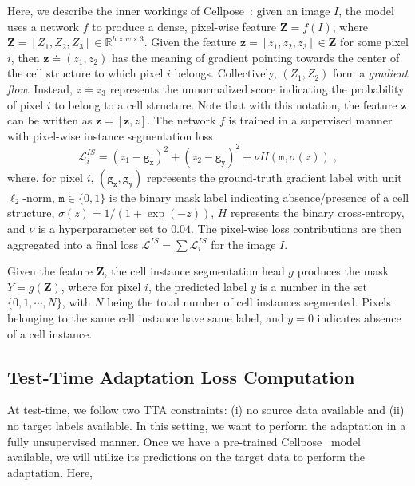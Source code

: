 Here, we describe the inner workings of Cellpose~\cite{stringer2021cellpose}: given an image $I$, the model uses a network $f$ to produce a dense, pixel-wise feature $\bm{Z} = f(I)$, where $ \bm{Z} = [Z_1, Z_2, Z_3] \in \mathbb{R}^{h \times w \times 3}$. Given the feature $\mathbf{z} = [z_1, z_2, z_3] \in \bm{Z}$ for some pixel $i$, then $\bm{z} \doteq (z_1, z_2)$ has the meaning of gradient pointing towards the center of the cell structure to which pixel $i$ belongs. Collectively, $(Z_1,Z_2)$ form a \emph{gradient flow}. Instead, $z \doteq z_3$ represents the unnormalized score indicating the probability of pixel $i$ to belong to a cell structure. Note that with this notation, the feature $\mathbf{z}$ can be written as $\mathbf{z} = [\bm{z}, z]$. The network $f$ is trained in a supervised manner with pixel-wise instance segmentation loss
\begin{equation}
  \mathcal{L}_i^{IS} = (z_1 - \mathtt{g_x})^2 + (z_2 - \mathtt{g_y})^2 + \nu H(\mathtt{m},\sigma(z))  \; ,
\end{equation}
where, for pixel $i$,  $(\mathtt{g_x}, \mathtt{g_y})$ represents the ground-truth gradient label with unit $\ell_2$-norm, $\mathtt{m} \in \{0, 1\}$ is the binary mask label indicating absence/presence of a cell structure, $\sigma(z) \doteq 1/(1+\exp(-z))$, $H$ represents the binary cross-entropy, and $\nu$ is a hyperparameter set to $0.04$. The pixel-wise loss contributions are then aggregated into a final loss $\mathcal{L}^{IS} = \sum \mathcal{L}_i^{IS}$ for the image $I$.


Given the feature $\bm{Z}$, the cell instance segmentation head $g$ produces the mask $Y = g(\bm{Z})$, where for pixel $i$, the predicted label $y$ is a number in the set $\{0, 1, \cdots, N \}$, with $N$ being the total number of cell instances segmented. Pixels belonging to the same cell instance have same label, and $y=0$ indicates absence of a cell instance. 


\subsection{Test-Time Adaptation Loss Computation}

At test-time, we follow two TTA constraints: (i) no source data available and (ii) no target labels available. In this setting, we want to perform the adaptation in a fully unsupervised manner. Once we have a pre-trained Cellpose~\cite{stringer2021cellpose} model available, we will utilize its predictions on the target data to perform the adaptation. Here,   

